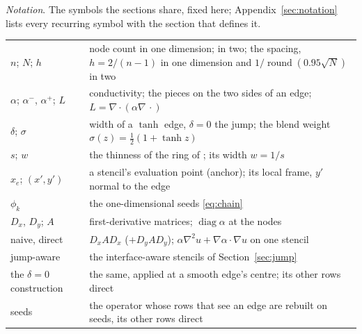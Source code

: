 \documentclass[11pt]{amsart}
\theoremstyle{definition}
\theoremstyle{remark}
\newcommand{\para}[1]{\par\smallskip\noindent\textit{#1}.\enspace}
\begin{document}
\para{Notation}
The symbols the sections share, fixed here; Appendix~\ref{sec:notation}
lists every recurring symbol with the section that defines it.
\begin{center}
\small
\begin{tabular}{@{}lp{}@{}}
\toprule
$n$; $N$; $h$ & node count in one dimension; in two; the spacing,
  $h = 2 / (n - 1)$ in one dimension and
  $1 / \operatorname{round}(0.95 \sqrt{N})$ in two \\
$\alpha$; $\alpha^-$, $\alpha^+$; $L$ & conductivity; the pieces on the two
  sides of an edge; $L = \nabla \cdot (\alpha \nabla\, \cdot)$ \\
$\delta$; $\sigma$ & width of a $\tanh$ edge, $\delta = 0$ the jump; the
  blend weight $\sigma(z) = \tfrac12 (1 + \tanh z)$ \\
$s$; $w$ & the thinness of the ring of \cite{MartinFornberg2017heat}; its
  width $w = 1/s$ \\
$x_e$; $(x', y')$ & a stencil's evaluation point (anchor); its local frame,
  $y'$ normal to the edge \\
$\phi_k$ & the one-dimensional seeds \eqref{eq:chain} \\
$D_x$, $D_y$; $A$ & first-derivative matrices; $\operatorname{diag}
  \alpha$ at the nodes \\
naive, direct & $D_x A D_x$ ($+ D_y A D_y$); $\alpha \nabla^2 u + \nabla
  \alpha \cdot \nabla u$ on one stencil \\
jump-aware & the interface-aware stencils of Section~\ref{sec:jump} \\
the $\delta = 0$ construction & the same, applied at a smooth edge's
  centre; its other rows direct \\
seeds & the operator whose rows that see an edge are rebuilt on seeds, its
  other rows direct \\
\bottomrule
\end{tabular}
\end{center}
\end{document}
